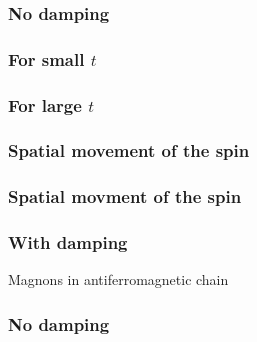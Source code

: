\documentclass{beamer}
\begin{document}
\begin{frame}
    \frametitle{No damping}
\begin{figure}
    \centering
    
\end{figure}
\end{frame}
\begin{frame}
    \frametitle{For small $t$}
\begin{figure}
    \centering
    
\end{figure}
\end{frame}
\begin{frame}
    \frametitle{For large $t$}
\begin{figure}
    \centering
    
\end{figure}
\end{frame}

\begin{frame}
    \frametitle{Spatial movement of the spin}
\begin{figure}
    \centering
    
\end{figure}
\end{frame}
\begin{frame}
    \frametitle{Spatial movment of the spin}
\begin{figure}
    \centering
    
\end{figure}
\end{frame}


\begin{frame}
    \frametitle{With damping}
\begin{figure}
    \centering
    
\end{figure}
\end{frame}

\begin{frame}
    \vfill
    \centering
    Magnons in antiferromagnetic chain
    \vfill
\end{frame}
\begin{frame}
    \frametitle{No damping}
\begin{figure}
    \centering
    
\end{figure}
\end{frame}
\end{document}
